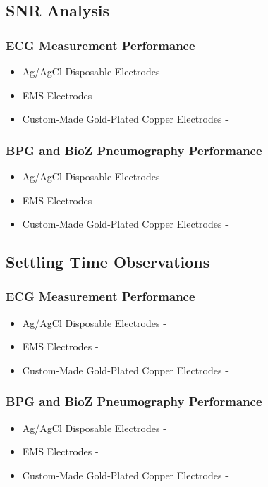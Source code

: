 \documentclass[conference]{IEEEtran}
\begin{document}
\subsection{SNR Analysis}
\subsubsection{ECG Measurement Performance}
\begin{itemize}
    \item Ag/AgCl Disposable Electrodes - 
    \item EMS Electrodes - 
    \item Custom-Made Gold-Plated Copper Electrodes - 
\end{itemize}
\subsubsection{BPG and BioZ Pneumography Performance}
\begin{itemize}
    \item Ag/AgCl Disposable Electrodes - 
    \item EMS Electrodes - 
    \item Custom-Made Gold-Plated Copper Electrodes -
\end{itemize}


\subsection{Settling Time Observations}

\subsubsection{ECG Measurement Performance}
\begin{itemize}
    \item Ag/AgCl Disposable Electrodes - 
    \item EMS Electrodes - 
    \item Custom-Made Gold-Plated Copper Electrodes -
\end{itemize}
\subsubsection{BPG and BioZ Pneumography Performance}
\begin{itemize}
    \item Ag/AgCl Disposable Electrodes - 
    \item EMS Electrodes - 
    \item Custom-Made Gold-Plated Copper Electrodes -
\end{itemize}
\end{document}
